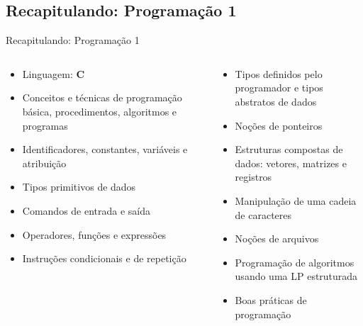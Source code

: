 \subsection{Recapitulando: Programação 1}

\begin{frame}{Recapitulando: Programação 1}
    \begin{columns}
    \begin{column}{0.5\textwidth}
        \minipage[c][0.7\textheight][s]{\columnwidth}
            \begin{itemize}
                \item Linguagem: \textbf{C}
                \item Conceitos e técnicas de programação básica, procedimentos, algoritmos e programas
                \item Identificadores, constantes, variáveis e atribuição
                \item Tipos primitivos de dados
                \item Comandos de entrada e saída
                \item Operadores, funções e expressões
                \item Instruções condicionais e de repetição
            \end{itemize}
            \vfill
        \endminipage
    \end{column}
    \begin{column}{0.5\textwidth}
        \minipage[c][0.7\textheight][s]{\columnwidth}
            \begin{itemize}
                \item Tipos definidos pelo programador e tipos abstratos de dados
                \item Noções de ponteiros
                \item Estruturas compostas de dados: vetores, matrizes e registros
                \item Manipulação de uma cadeia de caracteres
                \item Noções de arquivos
                \item Programação de algoritmos usando uma LP estruturada
                \item Boas práticas de programação
            \end{itemize}
            \vfill
        \endminipage
    \end{column}
    \end{columns}
\end{frame}

